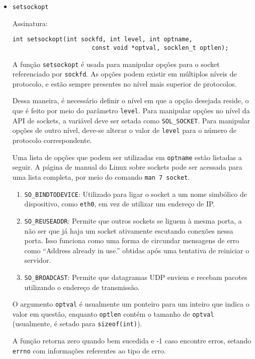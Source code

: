 \documentclass[a4paper,10pt]{article}
\begin{document}
\begin{itemize}
\item {\tt setsockopt}

Assinatura:
\begin{lstlisting}
int setsockopt(int sockfd, int level, int optname,
                      const void *optval, socklen_t optlen);
\end{lstlisting}

A função {\tt setsockopt} é usada para manipular opções para o socket referenciado por {\tt sockfd}. As opções podem existir em múltiplos níveis de protocolo, e estão sempre presentes no nível mais superior de protocolos.

Dessa maneira, é necessário definir o nível em que a opção desejada reside, o que é feito por meio do parâmetro {\tt level}. Para manipular opções no nível da API de sockets, a variável deve ser setada como {\tt SOL\_SOCKET}. Para manipular opções de outro nível, deve-se alterar o valor de {\tt level} para o número de protocolo correspondente.

Uma lista de opções que podem ser utilizadas em {\tt optname} estão listadas a seguir. A página de manual do Linux sobre sockets pode ser acessada para uma lista completa, por meio do comando {\tt man 7 socket}.

\begin{enumerate}
\item {\tt SO\_BINDTODEVICE}: Utilizado para ligar o socket a um nome simbólico de dispositivo, como {\tt eth0}, em vez de utilizar um endereço de IP.

\item {\tt SO\_REUSEADDR}: Permite que outros sockets se liguem à mesma porta, a não ser que já haja um socket ativamente escutando conexões nessa porta. Isso funciona como uma forma de circundar mensagens de erro como ``Address already in use.'' obtidas após uma tentativa de reiniciar o servidor.

\item {\tt SO\_BROADCAST}: Permite que datagramas UDP enviem e recebam pacotes utilizando o endereço de transmissão.
\end{enumerate}

O argumento {\tt optval} é usualmente um ponteiro para um inteiro que indica o valor em questão, enquanto {\tt optlen} contém o tamanho de {\tt optval} (usualmente, é setado para {\tt sizeof(int)}).

A função retorna zero quando bem sucedida e -1 caso encontre erros, setando {\tt errno} com informações referentes ao tipo de erro.

\end{itemize}
\end{document}
